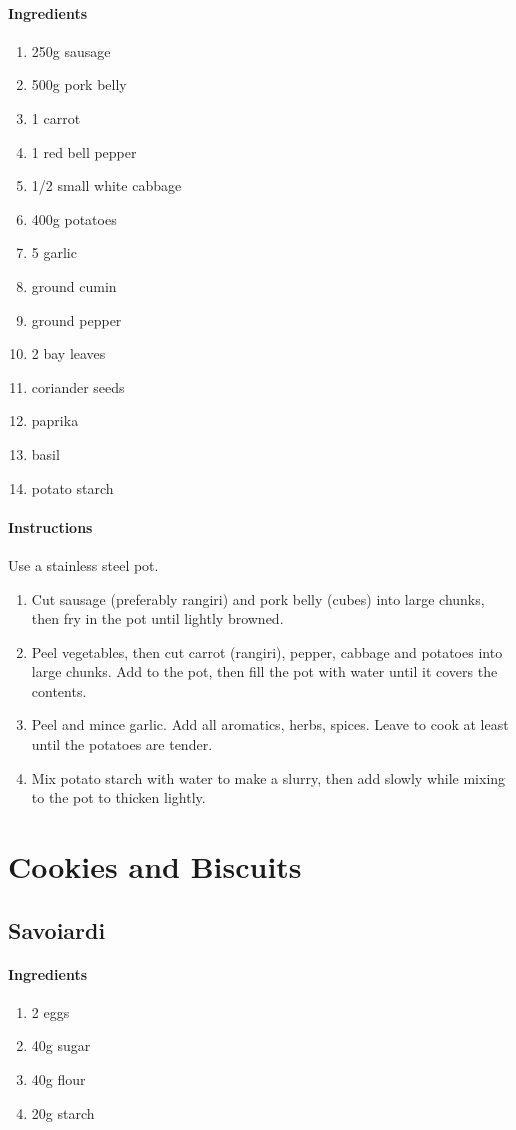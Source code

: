 \documentclass[11pt]{report}
\newcommand{\header}[1]{\subsubsection*{#1}}
\begin{document}
\header{Ingredients}
\begin{enumerate}
  \item 250g sausage
  \item 500g pork belly
  \item 1 carrot
  \item 1 red bell pepper
  \item 1/2 small white cabbage
  \item 400g potatoes
  \item 5 garlic
  \item ground cumin
  \item ground pepper
  \item 2 bay leaves
  \item coriander seeds
  \item paprika
  \item basil
  \item potato starch
\end{enumerate}

\header{Instructions}
Use a stainless steel pot.

\begin{enumerate}
  \item Cut sausage (preferably rangiri) and pork belly (cubes) into large
  chunks, then fry in the pot until lightly browned.
  \item Peel vegetables, then cut carrot (rangiri), pepper, cabbage and
  potatoes into large chunks. Add to the pot, then fill the pot with water
  until it covers the contents.
  \item Peel and mince garlic. Add all aromatics, herbs, spices. Leave to cook
  at least until the potatoes are tender.
  \item Mix potato starch with water to make a slurry, then add slowly while
  mixing to the pot to thicken lightly.
\end{enumerate}

\chapter{Cookies and Biscuits}

\section{Savoiardi \label{Savoiardi}}
\header{Ingredients}
\begin{enumerate}
  \item 2 eggs
  \item 40g sugar
  \item 40g flour
  \item 20g starch
\end{enumerate}
\end{document}
